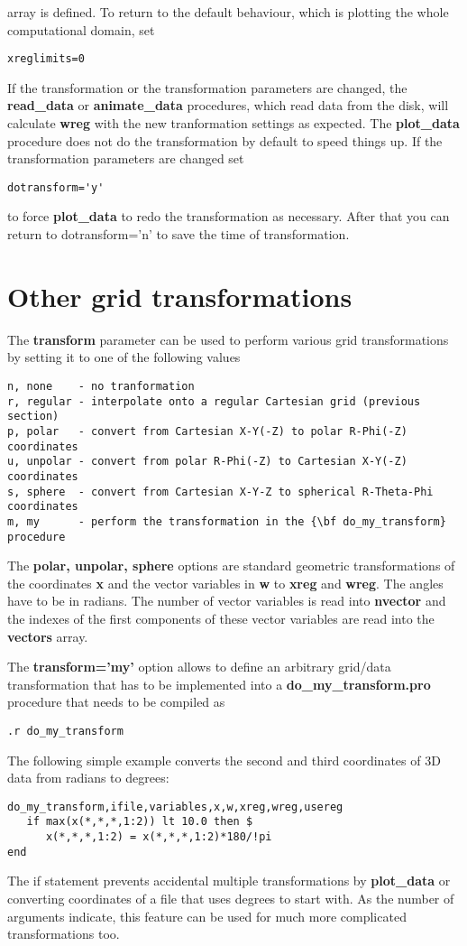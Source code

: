 \documentclass{article}
\begin{document}
   array is defined. 
   To return to the default behaviour, which is plotting the whole 
   computational domain, set
\begin{verbatim}
xreglimits=0
\end{verbatim}
   If the transformation or the transformation parameters are changed,
   the {\bf read\_data} or {\bf animate\_data} procedures, which read data from
   the disk, will calculate {\bf wreg} with the new tranformation settings
   as expected. The {\bf plot\_data} procedure does not do the transformation
   by default to speed things up. If the transformation parameters are changed set
\begin{verbatim}
dotransform='y'
\end{verbatim}
   to force {\bf plot\_data} to redo the transformation as necessary.
   After that you can return to dotransform='n' to save the time of
   transformation.

\section{Other grid transformations \label{s-gridtransform}}

   The {\bf transform} parameter can be used to perform various
   grid transformations by setting it to one of the following values
\begin{verbatim}
n, none    - no tranformation
r, regular - interpolate onto a regular Cartesian grid (previous section)
p, polar   - convert from Cartesian X-Y(-Z) to polar R-Phi(-Z) coordinates
u, unpolar - convert from polar R-Phi(-Z) to Cartesian X-Y(-Z) coordinates
s, sphere  - convert from Cartesian X-Y-Z to spherical R-Theta-Phi coordinates
m, my      - perform the transformation in the {\bf do_my_transform} procedure
\end{verbatim}
The {\bf polar, unpolar, sphere} options are standard geometric
transformations of the coordinates {\bf x} and the vector variables in
{\bf w} to {\bf xreg} and {\bf wreg}. The angles have to be in
radians.  The number of vector variables is read into {\bf nvector}
and the indexes of the first components of these vector variables are
read into the {\bf vectors} array.

The {\bf transform='my'} 
option allows to define an arbitrary grid/data transformation
that has to be implemented into a {\bf do\_my\_transform.pro}
procedure that needs to be compiled as
\begin{verbatim}
.r do_my_transform
\end{verbatim}
The following simple example converts the second and third coordinates 
of 3D data from radians to degrees:
\begin{verbatim}
do_my_transform,ifile,variables,x,w,xreg,wreg,usereg
   if max(x(*,*,*,1:2)) lt 10.0 then $
      x(*,*,*,1:2) = x(*,*,*,1:2)*180/!pi
end
\end{verbatim}
The if statement prevents accidental multiple transformations 
by {\bf plot\_data} or converting coordinates of a file that uses 
degrees to start with.
As the number of arguments indicate, this feature can be used for much more 
complicated transformations too.
\end{document}
